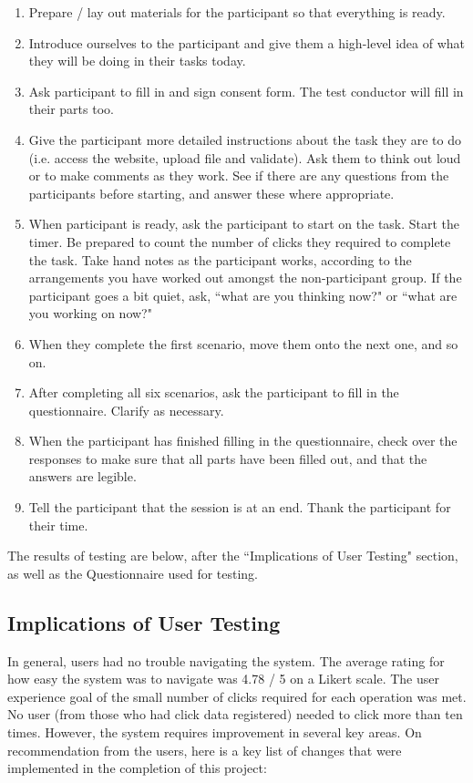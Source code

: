 \documentclass[10pt]{article}
\begin{document}
\begin{enumerate}
\item Prepare / lay out materials for the participant so that everything is ready.
\item Introduce ourselves to the participant and give them a high-level idea of what they will be doing in their tasks today.
\item Ask participant to fill in and sign consent form. The test conductor will fill in their parts too.
\item Give the participant more detailed instructions about the task they are to do (i.e. access the website, upload file and validate). Ask them to think out loud or to make comments as they work. See if there are any questions from the participants before starting, and answer these where appropriate.
\item When participant is ready, ask the participant to start on the task. Start the timer. Be prepared to count the number of clicks they required to complete the task. Take hand notes as the participant works, according to the arrangements you have worked out amongst the non-participant group. If the participant goes a bit quiet, ask, ``what are you thinking now?" or ``what are you working on now?"
\item When they complete the first scenario, move them onto the next one, and so on.
\item After completing all six scenarios, ask the participant to fill in the questionnaire. Clarify as necessary.
\item When the participant has finished filling in the questionnaire, check over the responses to make sure that all parts have been filled out, and that the answers are legible.
\item Tell the participant that the session is at an end. Thank the participant for their time.
\end{enumerate}

The results of testing are below, after the ``Implications of User Testing" section, as well as the Questionnaire used for testing.

\subsection{Implications of User Testing}

In general, users had no trouble navigating the system. The average rating for how easy the system was to navigate was 4.78 / 5 on a Likert scale. The user experience goal of the small number of clicks required for each operation was met. No user (from those who had click data registered) needed to click more than ten times. However, the system requires improvement in several key areas. On recommendation from the users, here is a key list of changes that were implemented in the completion of this project:
\end{document}
